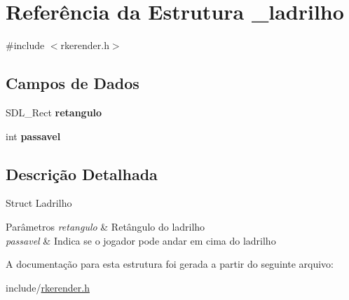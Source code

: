 \hypertarget{struct__ladrilho}{\section{Referência da Estrutura \-\_\-ladrilho}
\label{struct__ladrilho}
}


{\ttfamily \#include $<$rkerender.\-h$>$}

\subsection*{Campos de Dados}
\begin{DoxyCompactItemize}
\item 
\hypertarget{struct__ladrilho_a66706353d918fc22d4b7130ef5a9fbc4}{S\-D\-L\-\_\-\-Rect {\bfseries retangulo}}\label{struct__ladrilho_a66706353d918fc22d4b7130ef5a9fbc4}

\item 
\hypertarget{struct__ladrilho_af4541a0087b5e63cdca818a994d5119c}{int {\bfseries passavel}}\label{struct__ladrilho_af4541a0087b5e63cdca818a994d5119c}

\end{DoxyCompactItemize}


\subsection{Descrição Detalhada}
Struct Ladrilho 
\begin{DoxyParams}{Parâmetros}
{\em retangulo} & Retângulo do ladrilho \\
\hline
{\em passavel} & Indica se o jogador pode andar em cima do ladrilho \\
\hline
\end{DoxyParams}


A documentação para esta estrutura foi gerada a partir do seguinte arquivo\-:\begin{DoxyCompactItemize}
\item 
include/\hyperlink{rkerender_8h}{rkerender.\-h}\end{DoxyCompactItemize}
